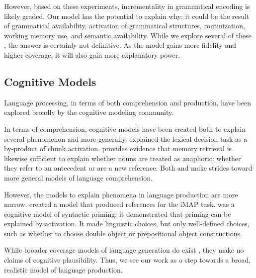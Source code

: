 However, based on these experiments, incrementality in grammatical encoding is likely graded. Our model has the potential to explain why: it could be the result of grammatical availability, activation of grammatical structures, routinization, working memory use, and semantic availability. While we explore several of these , the answer is certainly not definitive. As the model gains more fidelity and higher coverage, it will also gain more explanatory power. 

\subsection{Cognitive Models}
Language processing, in terms of both comprehension and production, have been explored broadly by the cognitive modeling community.

In terms of comprehension, cognitive models have been created both to explain several phenomenon and more generally. \citet{decision} explained the lexical decision task as a by-product of chunk activation. \citet{anaphoric} provides evidence that memory retrieval is likewise sufficient to explain whether nouns are treated as anaphoric: whether they refer to an antecedent or are a new reference. Both \citet{comp-model} and \citet{big-comprehension} make strides toward more general models of language comprehension.

However, the models to explain phenomena in language production are more narrow. \citet{references} created a model that produced references for the iMAP task. \citet{model-priming} was a cognitive model of syntactic priming; it demonstrated that priming can be explained by activation. It made linguistic choices, but only well-defined choices, such as whether to choose double object or prepositional object constructions. 

While broader coverage models of language generation do exist \citep{chart}, they make no claims of cognitive plausibility. Thus, we see our work as a step towards a broad, realistic model of language production. 